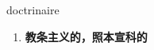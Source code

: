 
\begin{frame}
{\huge doctrinaire}
\begin{center}
\begin{enumerate}\Large
  \item \textbf{教条主义的，照本宣科的}
\end{enumerate}
\end{center}
\end{frame}
